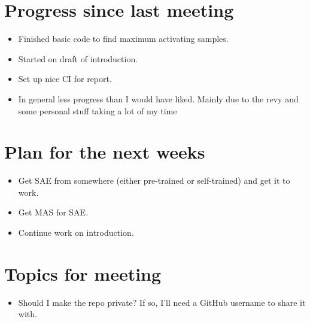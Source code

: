 \documentclass[main.tex]{subfiles}
\begin{document}
\section*{Progress since last meeting}
\begin{itemize}
    \item Finished basic code to find maximum activating samples.
    \item Started on draft of introduction.
    \item Set up nice CI for report.
    \item In general less progress than I would have liked.
    Mainly due to the revy and some personal stuff taking a lot of my time
\end{itemize}
\section*{Plan for the next weeks}
\begin{itemize}
    \item Get SAE from somewhere (either pre-trained or self-trained) and get it to work.
    \item Get MAS for SAE.
    \item Continue work on introduction.
\end{itemize}
\section*{Topics for meeting}
\begin{itemize}
    \item Should I make the repo private? If so, I'll need a GitHub username to share it with.
\end{itemize}
\end{document}
